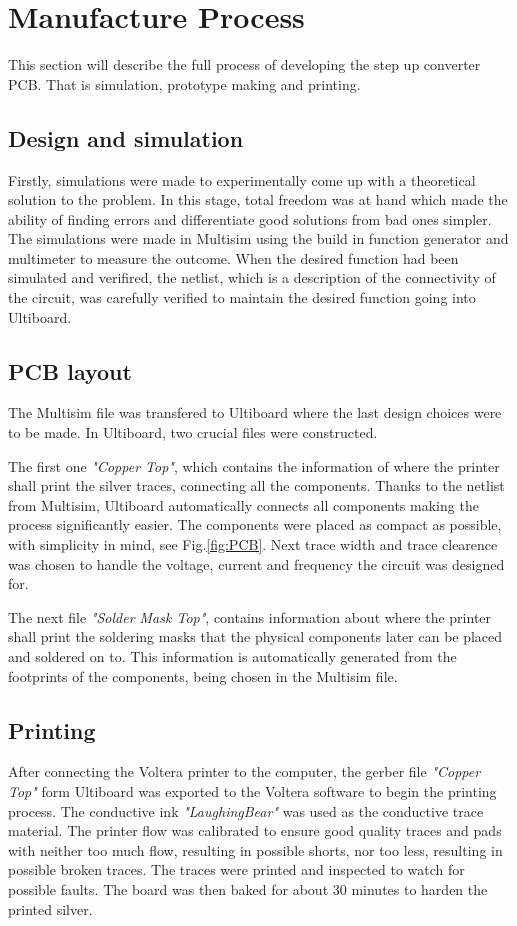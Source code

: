 \section{Manufacture Process}
This section will describe the full process of developing the step up converter PCB\@. That is simulation, prototype making and printing.\
\subsection{Design and simulation}
Firstly, simulations were made to experimentally come up with a theoretical solution to the problem. In this stage, total freedom was at hand which made the ability of finding errors and differentiate good solutions from bad ones simpler. The simulations were made in Multisim using the build in function generator and multimeter to measure the outcome. When the desired function had been simulated and verifired, the netlist, which is a description of the connectivity of the circuit, was carefully verified to maintain the desired function going into Ultiboard.
\subsection{PCB layout}
The Multisim file was transfered to Ultiboard where the last design choices were to be made. In Ultiboard, two crucial files were constructed.

The first one \textit{"Copper Top"}, which contains the information of where the printer shall print the silver traces, connecting all the components. Thanks to the netlist from Multisim, Ultiboard automatically connects all components making the process significantly easier. The components were placed as compact as possible, with simplicity in mind, see Fig.\ref{fig:PCB}. Next trace width and trace clearence was chosen to handle the voltage, current and frequency the circuit was designed for.

The next file \textit{"Solder Mask Top"}, contains information about where the printer shall print the soldering masks that the physical components later can be placed and soldered on to. This information is automatically generated from the footprints of the components, being chosen in the Multisim file.
\subsection{Printing}
After connecting the Voltera printer to the computer, the gerber file \textit{"Copper Top"} form Ultiboard was exported to the Voltera software to begin the printing process. The conductive ink \textit{"LaughingBear"} was used as the conductive trace material. The printer flow was calibrated to ensure good quality traces and pads with neither too much flow, resulting in possible shorts, nor too less, resulting in possible broken traces. The traces were printed and inspected to watch for possible faults. The board was then baked for about 30 minutes to harden the printed silver.

